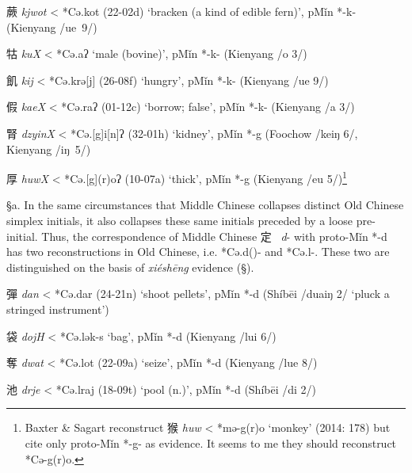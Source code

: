 \begin{description}
\item
蕨 \emph{kjwot} \textless{} *Cə.kot (22-02d) `bracken (a kind of edible
fern)', pMǐn *-k- (Kienyang /ue~9/)

\item
牯 \emph{kuX} \textless{} *Cə.{}aʔ `male (bovine)', pMǐn *-k- (Kienyang
/o 3/)

\item
飢 \emph{kij} \textless{} *Cə.krə{[}j] (26-08f) `hungry', pMǐn *-k-
(Kienyang /ue 9/)

\item
假 \emph{kaeX} \textless{} *Cə.{}raʔ (01-12c) `borrow; false', pMǐn *-k-
(Kienyang /a 3/)

\item
腎 \emph{dzyinX} \textless{} *Cə.[g]i[n]ʔ (32-01h) `kidney',
pMǐn *-g (Foochow /keiŋ 6/, Kienyang /iŋ~5/)

\item
厚 \emph{huwX} \textless{} *Cə.[g]{}(r)oʔ (10-07a) `thick', pMǐn *-g
(Kienyang /eu 5/)\footnote{Baxter \& Sagart reconstruct 猴 \emph{huw}
  \textless{} *mə-g{}(r)o `monkey' (2014: 178) but cite only proto-Mǐn
  *-g- as evidence. It seems to me they should reconstruct *Cə-g{}(r)o. }
\end{description}

§a. In the same circumstances that Middle Chinese collapses distinct Old
Chinese simplex initials, it also collapses these same initials preceded
by a loose pre-initial. Thus, the cor­re­spondence of Middle Chinese
定~ \emph{d}- with proto-Mǐn *-d has two re­con­structions in Old
Chinese, i.e. *Cə.d({})- and *Cə.l{}-. These two are distinguished on the
basis of  \emph{xiéshēng} evidence (§).

\begin{description} \item
彈 \emph{dan} \textless{} *Cə.d{}ar (24-21n) `shoot pellets', pMǐn *-d
(Shíbēi /duaiŋ 2/ `pluck a stringed instrument')

\item
袋 \emph{dojH} \textless{} *Cə.l{}ək-s `bag', pMǐn *-d (Kienyang /lui 6/)

\item
奪 \emph{dwat} \textless{} *Cə.l{}ot (22-09a) `seize', pMǐn *-d (Kienyang
/lue 8/)

\item
池 \emph{drje} \textless{} *Cə.lraj (18-09t) `pool (n.)', pMǐn *-d
(Shíbēi /di 2/)
\end{description}

